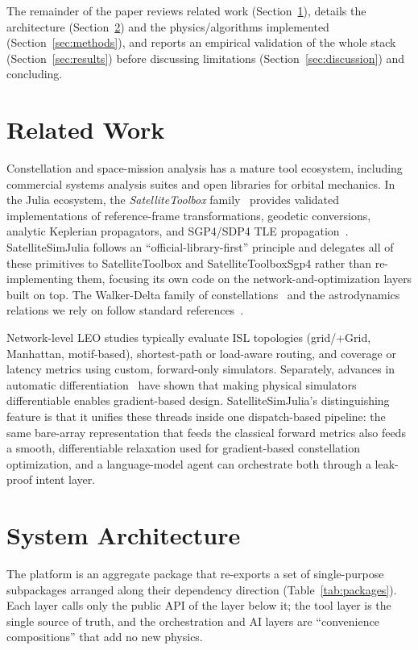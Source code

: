\documentclass[10pt,twocolumn]{article}
\begin{document}
The remainder of the paper reviews related work
(Section~\ref{sec:related}), details the architecture
(Section~\ref{sec:arch}) and the physics/algorithms implemented
(Section~\ref{sec:methods}), and reports an empirical validation of the whole
stack (Section~\ref{sec:results}) before discussing limitations
(Section~\ref{sec:discussion}) and concluding.

\section{Related Work}\label{sec:related}
Constellation and space-mission analysis has a mature tool ecosystem, including
commercial systems analysis suites and open libraries for orbital mechanics.
In the Julia ecosystem, the \emph{SatelliteToolbox} family~\cite{satellitetoolbox}
provides validated implementations of reference-frame transformations, geodetic
conversions, analytic Keplerian propagators, and SGP4/SDP4 TLE
propagation~\cite{sgp4}. SatelliteSimJulia follows an ``official-library-first''
principle and delegates all of these primitives to SatelliteToolbox and
SatelliteToolboxSgp4 rather than re-implementing them, focusing its own code on
the network-and-optimization layers built on top. The Walker-Delta family of
constellations~\cite{walker} and the astrodynamics relations we rely on follow
standard references~\cite{vallado}.

Network-level LEO studies typically evaluate ISL topologies (grid/+Grid,
Manhattan, motif-based), shortest-path or load-aware routing, and coverage or
latency metrics using custom, forward-only simulators. Separately, advances in automatic
differentiation~\cite{forwarddiff,zygote,enzyme} have shown that making physical
simulators differentiable enables gradient-based design. SatelliteSimJulia's distinguishing feature is that
it unifies these threads inside one dispatch-based pipeline: the same bare-array
representation that feeds the classical forward metrics also feeds a smooth,
differentiable relaxation used for gradient-based constellation optimization,
and a language-model agent can orchestrate both through a leak-proof intent
layer.

\section{System Architecture}\label{sec:arch}
The platform is an aggregate package that re-exports a set of single-purpose
subpackages arranged along their dependency direction
(Table~\ref{tab:packages}). Each layer calls only the public API of the layer
below it; the tool layer is the single source of truth, and the orchestration
and AI layers are ``convenience compositions'' that add no new physics.
\end{document}
